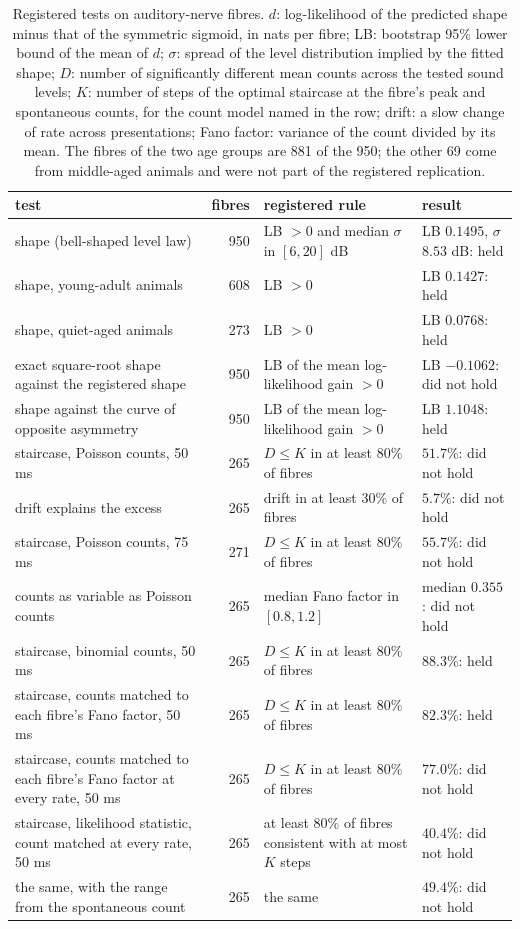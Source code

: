 \documentclass[10pt,letterpaper]{article}
\begin{document}
\begin{table}[tp]
\caption{Registered tests on auditory-nerve fibres. $d$: log-likelihood of the predicted shape minus that of the symmetric sigmoid,
in nats per fibre; LB: bootstrap 95\% lower bound of the mean of $d$; $\sigma$: spread of the level distribution implied by the fitted
shape; $D$: number of significantly different mean counts across the tested sound levels; $K$: number of steps of the optimal
staircase at the fibre's peak and spontaneous counts, for the count model named in the row; drift: a slow change of rate across
presentations; Fano factor: variance of the count divided by its mean. The fibres of the two age groups are 881 of the 950; the other 69 come from
middle-aged animals and were not part of the registered replication.}\label{tab:an}
\centering
\small
\begin{tabular}{>{\raggedright\arraybackslash}p{3.4cm}r>{\raggedright\arraybackslash}p{4.4cm}>{\raggedright\arraybackslash}p{3.6cm}}
\hline
test & fibres & registered rule & result\\
\hline
shape (bell-shaped level law) & 950 & LB $>0$ and median $\sigma$ in $[6,20]$ dB & LB $0.1495$, $\sigma$ $8.53$ dB: held\\
shape, young-adult animals & 608 & LB $>0$ & LB $0.1427$: held\\
shape, quiet-aged animals & 273 & LB $>0$ & LB $0.0768$: held\\
exact square-root shape against the registered shape & 950 & LB of the mean log-likelihood gain $>0$ & LB $-0.1062$: did not hold\\
shape against the curve of opposite asymmetry & 950 & LB of the mean log-likelihood gain $>0$ & LB $1.1048$: held\\
staircase, Poisson counts, 50 ms & 265 & $D\le K$ in at least $80\%$ of fibres & $51.7\%$: did not hold\\
drift explains the excess & 265 & drift in at least $30\%$ of fibres & $5.7\%$: did not hold\\
staircase, Poisson counts, 75 ms & 271 & $D\le K$ in at least $80\%$ of fibres & $55.7\%$: did not hold\\
counts as variable as Poisson counts & 265 & median Fano factor in $[0.8,1.2]$ & median $0.355$: did not hold\\
staircase, binomial counts, 50 ms & 265 & $D\le K$ in at least $80\%$ of fibres & $88.3\%$: held\\
staircase, counts matched to each fibre's Fano factor, 50 ms & 265 & $D\le K$ in at least $80\%$ of fibres & $82.3\%$: held\\
staircase, counts matched to each fibre's Fano factor at every rate, 50 ms & 265 & $D\le K$ in at least $80\%$ of fibres & $77.0\%$: did not hold\\
staircase, likelihood statistic, count matched at every rate, 50 ms & 265 & at least $80\%$ of fibres consistent with at most $K$ steps & $40.4\%$: did not hold\\
the same, with the range from the spontaneous count & 265 & the same & $49.4\%$: did not hold\\
\hline
\end{tabular}
\end{table}
\end{document}
